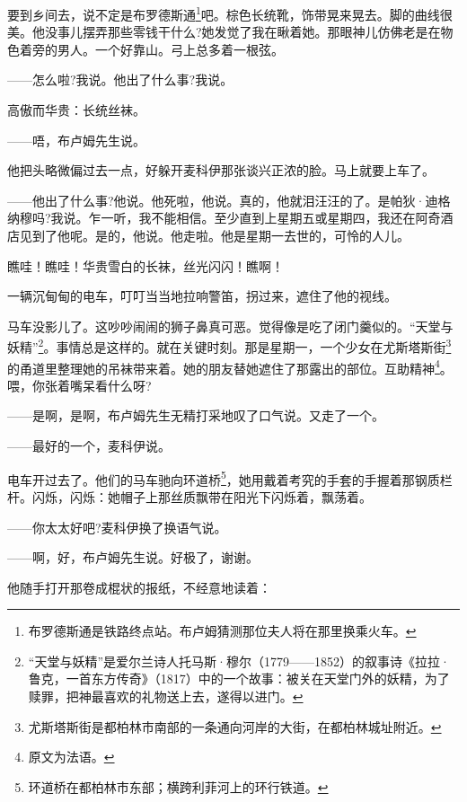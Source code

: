 \par 要到乡间去，说不定是布罗德斯通\footnote{布罗德斯通是铁路终点站。布卢姆猜测那位夫人将在那里换乘火车。}吧。棕色长统靴，饰带晃来晃去。脚的曲线很美。他没事儿摆弄那些零钱干什么?她发觉了我在瞅着她。那眼神儿仿佛老是在物色着旁的男人。一个好靠山。弓上总多着一根弦。
\par ——怎么啦?我说。他出了什么事?我说。
\par 高傲而华贵：长统丝袜。
\par ——唔，布卢姆先生说。
\par 他把头略微偏过去一点，好躲开麦科伊那张谈兴正浓的脸。马上就要上车了。
\par ——他出了什么事?他说。他死啦，他说。真的，他就泪汪汪的了。是帕狄·迪格纳穆吗?我说。乍一听，我不能相信。至少直到上星期五或星期四，我还在阿奇酒店见到了他呢。是的，他说。他走啦。他是星期一去世的，可怜的人儿。
\par 瞧哇！瞧哇！华贵雪白的长袜，丝光闪闪！瞧啊！
\par 一辆沉甸甸的电车，叮叮当当地拉响警笛，拐过来，遮住了他的视线。
\par 马车没影儿了。这吵吵闹闹的狮子鼻真可恶。觉得像是吃了闭门羹似的。“天堂与妖精”\footnote{“天堂与妖精”是爱尔兰诗人托马斯·穆尔（1779——1852）的叙事诗《拉拉·鲁克，一首东方传奇》（1817）中的一个故事：被关在天堂门外的妖精，为了赎罪，把神最喜欢的礼物送上去，遂得以进门。}。事情总是这样的。就在关键时刻。那是星期一，一个少女在尤斯塔斯街\footnote{尤斯塔斯街是都柏林市南部的一条通向河岸的大街，在都柏林城址附近。}的甬道里整理她的吊袜带来着。她的朋友替她遮住了那露出的部位。互助精神\footnote{原文为法语。}。喂，你张着嘴呆看什么呀?
\par ——是啊，是啊，布卢姆先生无精打采地叹了口气说。又走了一个。
\par ——最好的一个，麦科伊说。
\par 电车开过去了。他们的马车驰向环道桥\footnote{环道桥在都柏林市东部；横跨利菲河上的环行铁道。}，她用戴着考究的手套的手握着那钢质栏杆。闪烁，闪烁：她帽子上那丝质飘带在阳光下闪烁着，飘荡着。
\par ——你太太好吧?麦科伊换了换语气说。
\par ——啊，好，布卢姆先生说。好极了，谢谢。
\par 他随手打开那卷成棍状的报纸，不经意地读着：
